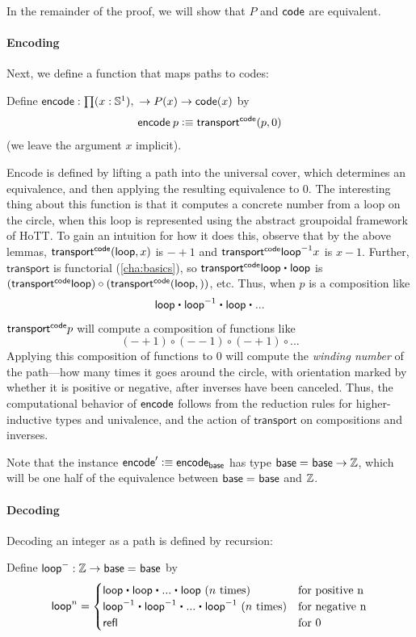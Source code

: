 In the remainder of the proof, we will show that $P$ and $\mathsf{code}$ are
equivalent.  

\paragraph{Encoding}

Next, we define a function \encode that maps paths to codes:
\begin{defn}
Define $\encode : \prd{x : \Sn ^1} \rightarrow P(x) \rightarrow  \code(x)$ by 
\[
\mathsf{encode} \: p \vcentcolon\equiv \mathsf{transport}^{\mathsf{code}}(p,0)
\]
(we leave the argument $x$ implicit).  
\end{defn}
Encode is defined by lifting a path into the universal cover, which
determines an equivalence, and then applying the resulting equivalence
to $0$.  
The interesting thing about this function is that it computes a concrete
number from a loop on the circle, when this loop is represented using
the abstract groupoidal framework of HoTT.  To gain an
intuition for how it does this, observe that by the above lemmas,
$\mathsf{transport}^{\mathsf{code}}(\mathsf{loop},x)$ is $-+1$ and $\mathsf{transport}^{\mathsf{code}} {\mathord{{\mathsf{loop}}^{-1}}} x$ is $x - 1$.  Further, $\mathsf{transport}$ is functorial
(\autoref{cha:basics}), so $\transfibf{\code} {\lloop \ct \lloop}$ is
$(\mathsf{transport}^{\mathsf{code}} \mathsf{loop}) \circ (\mathsf{transport}^{\mathsf{code}}(\mathsf{loop},))$, etc.  Thus, when $p$ is a
composition like 
\[
\lloop \ct \opp \lloop \ct \lloop \ct ...
\]
$\mathsf{transport}^{\mathsf{code}}{p}$ will compute a composition of functions like
\[
(- + 1) \circ (- -1) \circ (- + 1) \circ ... 
\]
Applying this composition of functions to 0 will compute the
\emph{winding number} of the path---how many times it goes around the
circle, with orientation marked by whether it is positive or negative,
after inverses have been canceled.  Thus, the computational behavior of
$\mathsf{encode}$ follows from the reduction rules for higher-inductive types and
univalence, and the action of $\mathsf{transport}$ on compositions and inverses.

Note that the instance $\mathsf{encode}' \vcentcolon\equiv \mathsf{encode}_{\mathsf{base}}$ has type 
$\mathsf{base} =_{} \mathsf{base} \rightarrow \mathbb{Z}$, which will be one half of the
equivalence between $\mathsf{base} =_{} \mathsf{base}$ and $\mathbb{Z}$.  

\paragraph{Decoding}  

Decoding an integer as a path is defined by recursion:

\begin{defn}
Define $\mathsf{loop}^- : \mathbb{Z} \rightarrow \mathsf{base} =_{} \mathsf{base}$ by 
\[
\lloop^n = \begin{cases} \lloop \ct \lloop \ct ... \ct \lloop \text{ ($n$ times) } & \text{for positive n} \\
 \opp \lloop \ct \opp \lloop \ct ... \ct \opp \lloop \text{ ($n$ times)} & \text{for negative n} \\
  \refl{} & \text{for 0}  
\end{cases}
\]
\end{defn}

